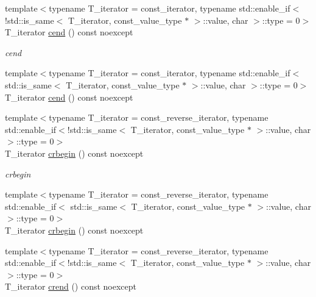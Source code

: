 \begin{DoxyCompactItemize}
\item 
{\footnotesize template$<$typename T\+\_\+iterator  = const\+\_\+iterator, typename std\+::enable\+\_\+if$<$!std\+::is\+\_\+same$<$ T\+\_\+iterator, const\+\_\+value\+\_\+type $\ast$ $>$\+::value, char $>$\+::type  = 0$>$ }\\T\+\_\+iterator \hyperlink{classIceBRG_1_1labeled__array__row__reference_ac51579aff50e4f6c41fa94be1028b387}{cend} () const  noexcept
\begin{DoxyCompactList}\small\item\em cend \end{DoxyCompactList}\item 
{\footnotesize template$<$typename T\+\_\+iterator  = const\+\_\+iterator, typename std\+::enable\+\_\+if$<$ std\+::is\+\_\+same$<$ T\+\_\+iterator, const\+\_\+value\+\_\+type $\ast$ $>$\+::value, char $>$\+::type  = 0$>$ }\\T\+\_\+iterator \hyperlink{classIceBRG_1_1labeled__array__row__reference_ac51579aff50e4f6c41fa94be1028b387}{cend} () const  noexcept
\item 
{\footnotesize template$<$typename T\+\_\+iterator  = const\+\_\+reverse\+\_\+iterator, typename std\+::enable\+\_\+if$<$!std\+::is\+\_\+same$<$ T\+\_\+iterator, const\+\_\+value\+\_\+type $\ast$ $>$\+::value, char $>$\+::type  = 0$>$ }\\T\+\_\+iterator \hyperlink{classIceBRG_1_1labeled__array__row__reference_a991b98e4c2251b590ef4db8c800b1d40}{crbegin} () const  noexcept
\begin{DoxyCompactList}\small\item\em crbegin \end{DoxyCompactList}\item 
{\footnotesize template$<$typename T\+\_\+iterator  = const\+\_\+reverse\+\_\+iterator, typename std\+::enable\+\_\+if$<$ std\+::is\+\_\+same$<$ T\+\_\+iterator, const\+\_\+value\+\_\+type $\ast$ $>$\+::value, char $>$\+::type  = 0$>$ }\\T\+\_\+iterator \hyperlink{classIceBRG_1_1labeled__array__row__reference_a991b98e4c2251b590ef4db8c800b1d40}{crbegin} () const  noexcept
\item 
{\footnotesize template$<$typename T\+\_\+iterator  = const\+\_\+reverse\+\_\+iterator, typename std\+::enable\+\_\+if$<$!std\+::is\+\_\+same$<$ T\+\_\+iterator, const\+\_\+value\+\_\+type $\ast$ $>$\+::value, char $>$\+::type  = 0$>$ }\\T\+\_\+iterator \hyperlink{classIceBRG_1_1labeled__array__row__reference_a2a2500834824ec67a61f748375e66c62}{crend} () const  noexcept

\end{DoxyCompactItemize}
